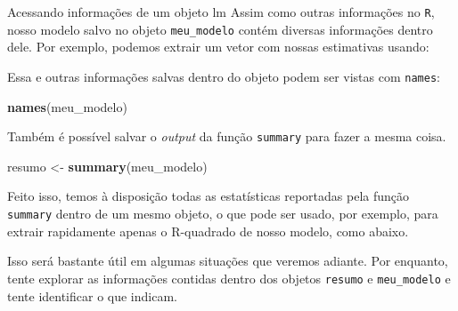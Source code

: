 \documentclass[
  9pt,
  ignorenonframetext,
  aspectratio=169]{beamer}
\newenvironment{Shaded}{\begin{snugshade}}{\end{snugshade}}
\newcommand{\KeywordTok}[1]{\textcolor[rgb]{0.13,0.29,0.53}{\textbf{#1}}}
\newcommand{\NormalTok}[1]{#1}
\newcommand{\OperatorTok}[1]{\textcolor[rgb]{0.81,0.36,0.00}{\textbf{#1}}}
\newcommand{\StringTok}[1]{\textcolor[rgb]{0.31,0.60,0.02}{#1}}
\begin{document}
\begin{frame}[fragile]{Acessando informações de um objeto lm}
\protect\hypertarget{acessando-informauxe7uxf5es-de-um-objeto-lm}{}
Assim como outras informações no \texttt{R}, nosso modelo salvo no
objeto \texttt{meu\_modelo} contém diversas informações dentro dele. Por
exemplo, podemos extrair um vetor com nossas estimativas usando:

\begin{Shaded}
\end{Shaded}

Essa e outras informações salvas dentro do objeto podem ser vistas com
\texttt{names}:

\begin{Shaded}
\begin{Highlighting}[]
\KeywordTok{names}\NormalTok{(meu\_modelo)}
\end{Highlighting}
\end{Shaded}

Também é possível salvar o \emph{output} da função \texttt{summary} para
fazer a mesma coisa.

\begin{Shaded}
\begin{Highlighting}[]
\NormalTok{resumo \textless{}{-}}\StringTok{ }\KeywordTok{summary}\NormalTok{(meu\_modelo)}
\end{Highlighting}
\end{Shaded}

Feito isso, temos à disposição todas as estatísticas reportadas pela
função \texttt{summary} dentro de um mesmo objeto, o que pode ser usado,
por exemplo, para extrair rapidamente apenas o R-quadrado de nosso
modelo, como abaixo.

\begin{Shaded}
\end{Shaded}

Isso será bastante útil em algumas situações que veremos adiante. Por
enquanto, tente explorar as informações contidas dentro dos objetos
\texttt{resumo} e \texttt{meu\_modelo} e tente identificar o que
indicam.
\end{frame}
\end{document}
